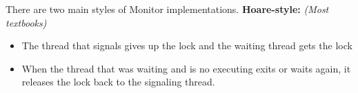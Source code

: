 There are two main styles of Monitor implementations. 
\textbf{Hoare-style:} \emph{(Most textbooks)}
\begin{itemize}
    \item The thread that signals gives up the lock and the waiting thread gets
        the lock
    \item When the thread that was waiting and is no executing exits or waits
        again, it releases the lock back to the signaling thread.
\end{itemize}
